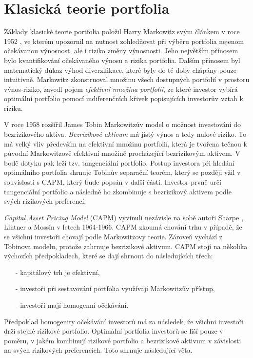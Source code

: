 \documentclass[a4paper,12pt]{report}
\theoremstyle{definition} \newtheorem{definice}[veta]{Definice}
\theoremstyle{remark}
\begin{document}


\section{Klasická teorie portfolia}\label{KTP}

Základy klasické teorie portfolia položil Harry Markowitz svým článkem v roce 1952 \cite{markowitz}, ve kterém upozornil na nutnost zohledňovat při výběru portfolia nejenom očekávanou výnosnost, ale i riziko změny výnosnosti.
Jeho největším přínosem bylo kvantifikování očekávaného výnosu a rizika portfolia. 
Dalším přínosem byl matematický důkaz výhod diverzifikace, které byly do té doby chápány pouze intuitivně.
Markowitz zkonstruoval množinu všech dostupných portfolií v prostoru výnos-riziko, zavedl pojem \textit{efektivní množina portfolií}, ze které investor vybírá optimální portfolio pomocí indiferenčních křivek popisujících investorův vztah k riziku.

V roce 1958 rozšířil James Tobin \cite{tobin} Markowitzův model o možnost investování do bezrizikového aktiva.
\textit{Bezrizikové aktivum} má jistý výnos a tedy nulové riziko.
To má velký vliv především na efektivní množinu portfolií, která je tvořena tečnou k původní Markowitzově efektivní množině procházející bezrizikovým aktivem.
V bodě dotyku pak leží tzv. tangenciální portfolio.
Postup investora při hledání optimálního portfolia shrnuje Tobinův separační teorém, který se později vžil v souvislosti s CAPM, který bude popsán v další části.%
Investor prvně určí tangenciální portfolio a následně ho zkombinuje s bezrizikový aktivem podle svých rizikových preferencí.

\textit{Capital Asset Pricing Model} (CAPM) vyvinuli nezávisle na sobě autoři Sharpe \cite{sharpe1964}, Lintner \cite{lintner1965} a Mossin \cite{mossin1966} v letech 1964-1966. CAPM zkoumá chování trhu v případě, že se všichni investoři chovají podle Markowitzovy teorie.
Zároveň vychází z Tobinova modelu, protože zahrnuje bezrizikové aktivum.
CAPM stojí na několika výchozích předpokladech, které se dají shrnout do následujících třech:
\begin{itemize}
\item[-] kapitálový trh je efektivní,
\item[-] investoři při sestavování portfolia využívají Markowitzův přístup,
\item[-] investoři mají homogenní očekávání.
\end{itemize}
Předpoklad homogenity očekávání investorů má za následek, že všichni investoři drží stejné rizikové portfolio.
Optimální portfolia investorů se liší pouze v poměru, v jakém kombinují rizikové portfolio a bezrizikové aktivum v závislosti na svých rizikových preferencích.
Toto shrnuje následující věta.
\end{document}
